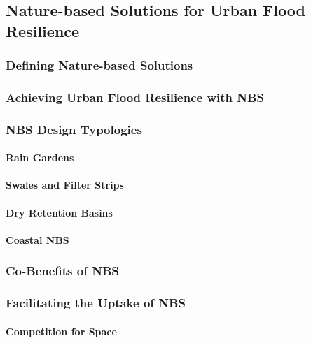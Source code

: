 \subsection{Nature-based Solutions for Urban Flood Resilience}

\subsubsection{Defining Nature-based Solutions}

\subsubsection{Achieving Urban Flood Resilience with NBS}

\subsubsection{NBS Design Typologies}

\paragraph{Rain Gardens}

\paragraph{Swales and Filter Strips}

\paragraph{Dry Retention Basins}

\paragraph{Coastal NBS}

\subsubsection{Co-Benefits of NBS}

\subsubsection{Facilitating the Uptake of NBS}

\paragraph{Competition for Space}

